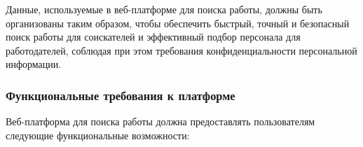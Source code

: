 Данные, используемые в веб-платформе для поиска работы, должны быть организованы таким образом, чтобы обеспечить быстрый, точный и безопасный поиск работы для соискателей и эффективный подбор персонала для работодателей, соблюдая при этом требования конфиденциальности персональной информации.

\subsubsection{Функциональные требования к платформе}

Веб-платформа для поиска работы должна предоставлять пользователям следующие функциональные возможности:

